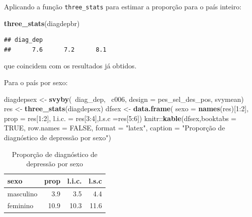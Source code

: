 \documentclass[]{book}
\newenvironment{Shaded}{\begin{snugshade}}{\end{snugshade}}
\newcommand{\KeywordTok}[1]{\textcolor[rgb]{0.13,0.29,0.53}{\textbf{{#1}}}}
\newcommand{\DataTypeTok}[1]{\textcolor[rgb]{0.13,0.29,0.53}{{#1}}}
\newcommand{\DecValTok}[1]{\textcolor[rgb]{0.00,0.00,0.81}{{#1}}}
\newcommand{\StringTok}[1]{\textcolor[rgb]{0.31,0.60,0.02}{{#1}}}
\newcommand{\OtherTok}[1]{\textcolor[rgb]{0.56,0.35,0.01}{{#1}}}
\newcommand{\NormalTok}[1]{{#1}}
\numberwithin{example}{chapter}
\numberwithin{remark}{chapter}
\numberwithin{definition}{chapter}
\begin{document}
Aplicando a função \texttt{three\_stats} para estimar a proporção para o
país inteiro:

\begin{Shaded}
\begin{Highlighting}[]
\KeywordTok{three_stats}\NormalTok{(diagdepbr)}
\end{Highlighting}
\end{Shaded}

\begin{verbatim}
## diag_dep                   
##      7.6      7.2      8.1
\end{verbatim}

que coincidem com os resultados já obtidos.

Para o país por sexo:

\begin{Shaded}
\begin{Highlighting}[]
\NormalTok{diagdepsex <-}\StringTok{ }\KeywordTok{svyby}\NormalTok{(~diag_dep, ~c006, }\DataTypeTok{design =} \NormalTok{pes_sel_des_pos, }
  \NormalTok{svymean)}
\NormalTok{res <-}\StringTok{ }\KeywordTok{three_stats}\NormalTok{(diagdepsex)}
\NormalTok{dfsex <-}\StringTok{ }\KeywordTok{data.frame}\NormalTok{( }\DataTypeTok{sexo =} \KeywordTok{names}\NormalTok{(res)[}\DecValTok{1}\NormalTok{:}\DecValTok{2}\NormalTok{], }\DataTypeTok{prop =} \NormalTok{res[}\DecValTok{1}\NormalTok{:}\DecValTok{2}\NormalTok{], }\DataTypeTok{l.i.c. =} \NormalTok{res[}\DecValTok{3}\NormalTok{:}\DecValTok{4}\NormalTok{],}\DataTypeTok{l.s.c =}\NormalTok{res[}\DecValTok{5}\NormalTok{:}\DecValTok{6}\NormalTok{])}
\NormalTok{knitr::}\KeywordTok{kable}\NormalTok{(dfsex,}\DataTypeTok{booktabs =} \OtherTok{TRUE}\NormalTok{, }\DataTypeTok{row.names =} \OtherTok{FALSE}\NormalTok{, }\DataTypeTok{format =} \StringTok{"latex"}\NormalTok{, }
\DataTypeTok{caption =} \StringTok{"Proporção de diagnóstico de depressão por sexo"}\NormalTok{)}
\end{Highlighting}
\end{Shaded}

\begin{table}

\caption{\label{tab:unnamed-chunk-42}Proporção de diagnóstico de depressão por sexo}
\centering
\begin{tabular}[t]{lrrr}
\toprule
sexo & prop & l.i.c. & l.s.c\\
\midrule
masculino & 3.9 & 3.5 & 4.4\\
feminino & 10.9 & 10.3 & 11.6\\
\bottomrule
\end{tabular}
\end{table}
\end{document}
